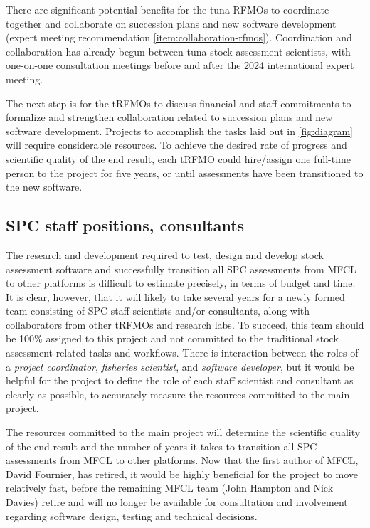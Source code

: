 \documentclass{SCreport}
\begin{document}
There are significant potential benefits for the tuna RFMOs to coordinate
together and collaborate on succession plans and new software development
(expert meeting recommendation \ref{item:collaboration-rfmos}). Coordination and
collaboration has already begun between tuna stock assessment scientists, with
one-on-one consultation meetings before and after the 2024 international expert
meeting.

The next step is for the tRFMOs to discuss financial and staff commitments to
formalize and strengthen collaboration related to succession plans and new
software development. Projects to accomplish the tasks laid out in
\autoref{fig:diagram} will require considerable resources. To achieve the
desired rate of progress and scientific quality of the end result, each tRFMO
could hire/assign one full-time person to the project for five years, or until
assessments have been transitioned to the new software.

\subsection{SPC staff positions, consultants}

The research and development required to test, design and develop stock
assessment software and successfully transition all SPC assessments from MFCL to
other platforms is difficult to estimate precisely, in terms of budget and time.
It is clear, however, that it will likely to take several years for a newly
formed team consisting of SPC staff scientists and/or consultants, along with
collaborators from other tRFMOs and research labs. To succeed, this team should
be 100\% assigned to this project and not committed to the traditional stock
assessment related tasks and workflows. There is interaction between the roles
of a \emph{project coordinator}, \emph{fisheries scientist}, and \emph{software
  developer}, but it would be helpful for the project to define the role of each
staff scientist and consultant as clearly as possible, to accurately measure the
resources committed to the main project.

The resources committed to the main project will determine the scientific
quality of the end result and the number of years it takes to transition all SPC
assessments from MFCL to other platforms. Now that the first author of MFCL,
David Fournier, has retired, it would be highly beneficial for the project to
move relatively fast, before the remaining MFCL team (John Hampton and Nick
Davies) retire and will no longer be available for consultation and involvement
regarding software design, testing and technical decisions.
\end{document}

